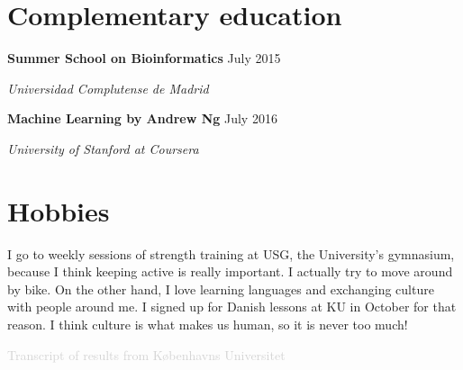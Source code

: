 \documentclass[paper=a4,fontsize=11pt]{article}
\newcommand{\NewPart}[1]{\section*{
{#1}}}
\newcommand{\SEntry}[3]{
		\noindent \textbf{#1} \hfill      %
		\textsf{#2} \par                  %
		\noindent \textit{#3} \par        %
		  \vspace{7.5pt}}
\begin{document}
\thispagestyle{empty}
	

\NewPart{Complementary education}{}


\SEntry{Summer School on Bioinformatics}{July 2015}{Universidad Complutense de Madrid} 
  
\SEntry{Machine Learning by Andrew Ng}{July 2016}{University of Stanford at Coursera}

\NewPart{Hobbies}
I go to weekly sessions of strength training at USG, the University's gymnasium, because I think keeping active is really important. I actually try to move around by bike. On the other hand, I love learning languages and exchanging culture with people around me. I signed up for Danish lessons at KU in October for that reason. I think culture is what makes us human, so it is never too much!



\vfill
\textcolor{lightgray}{Transcript of results from K{\o}benhavns Universitet}



\end{document}
